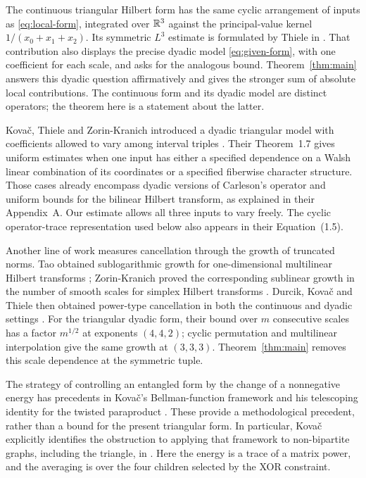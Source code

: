The continuous triangular Hilbert form has the same cyclic arrangement
of inputs as \eqref{eq:local-form}, integrated over \(\mathbb R^3\) against the
principal-value kernel \(1/(x_0+x_1+x_2)\). Its symmetric \(L^3\) estimate is formulated by
Thiele in \cite[Section~9, Problem~13]{ThieleProblem2017}. That
contribution also displays the precise dyadic model
\eqref{eq:given-form}, with one coefficient for each scale, and asks
for the analogous bound. Theorem~\ref{thm:main} answers this dyadic
question affirmatively and gives the stronger sum of absolute local
contributions. The continuous form and its dyadic model are distinct
operators; the theorem here is a statement about the latter.

Kova\v{c}, Thiele and Zorin-Kranich introduced a dyadic triangular
model with coefficients allowed to vary among interval triples
\cite[Equations~(1.5)--(1.6)]{KTZ2015}. Their Theorem~1.7 gives
uniform estimates when one input has either a specified dependence
on a Walsh linear combination of its coordinates or a specified
fiberwise character structure. Those cases already encompass dyadic
versions of Carleson's operator and uniform bounds for the bilinear
Hilbert transform, as explained in their Appendix~A. Our estimate
allows all three inputs to vary freely. The cyclic operator-trace
representation used below also appears in their Equation~(1.5).

Another line of work measures cancellation through the growth of
truncated norms. Tao obtained sublogarithmic growth for
one-dimensional multilinear Hilbert transforms
\cite[Theorem~1.2]{Tao2016}; Zorin-Kranich proved the corresponding
sublinear growth in the number of smooth scales for simplex Hilbert
transforms \cite[Theorem~1.3]{ZK2017}. Durcik, Kova\v{c} and Thiele
then obtained power-type cancellation in both the continuous and
dyadic settings \cite[Theorems~1 and~4]{DKT2019}. For the triangular
dyadic form, their bound over \(m\) consecutive scales has a factor
\(m^{1/2}\) at exponents \((4,4,2)\); cyclic permutation and multilinear
interpolation give the same growth at \((3,3,3)\). Theorem~\ref{thm:main}
removes this scale dependence at the symmetric tuple.

The strategy of controlling an entangled form by the change of a
nonnegative energy has precedents in Kova\v{c}'s Bellman-function
framework \cite[Section~2]{Kovac2011} and his telescoping identity
for the twisted paraproduct \cite[Lemma~2]{Kovac2012}.
These provide a methodological precedent, rather than a bound for the
present triangular form. In particular, Kova\v{c} explicitly identifies
the obstruction to applying that framework to non-bipartite graphs,
including the triangle, in \cite[Section~6.2]{Kovac2011}.
Here the energy is a trace of a matrix power, and the averaging is
over the four children selected by the XOR constraint.

